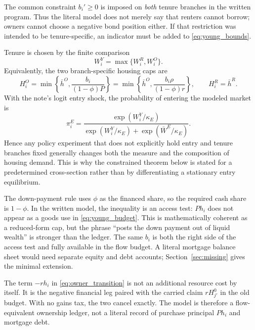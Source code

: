 \documentclass[11pt]{article}
\newcommand{\1}{\mathbf 1}
\begin{document}
The common constraint $b_i'\ge0$ is imposed on \emph{both} tenure branches in
the written program. Thus the literal model does not merely say that renters
cannot borrow; owners cannot choose a negative bond position either. If that
restriction was intended to be tenure-specific, an indicator must be added to
\eqref{eq:young_bounds}.

Tenure is chosen by the finite comparison
\begin{equation}
W_i^Y=\max\{W_i^R,W_i^O\}.
\label{eq:tenure_choice}
\end{equation}
Equivalently, the two branch-specific housing caps are
\begin{equation}
H_i^O=\min\left\{\bar h^O,
\frac{b_i}{(1-\phi)P}\right\}
=\min\left\{\bar h^O,
\frac{b_i\rho}{(1-\phi)r}\right\},
\qquad H_i^R=\bar h^R.
\label{eq:effective_caps}
\end{equation}
With the note's logit entry shock, the probability of entering the modeled
market is
\begin{equation}
\pi_i^E=
\frac{\exp(W_i^Y/\kappa_E)}
{\exp(W_i^Y/\kappa_E)+\exp(\bar W^E/\kappa_E)}.
\label{eq:entry_probability}
\end{equation}
Hence any policy experiment that does not explicitly hold entry and tenure
branches fixed generally changes both the measure and the composition of
housing demand. This is why the constrained theorem below is stated for a
predetermined cross-section rather than by differentiating a stationary
entry equilibrium.

The down-payment rule uses $\phi$ as the financed share, so the required cash
share is $1-\phi$. In the written model, the inequality is an access test:
$P h_i$ does not appear as a goods use in \eqref{eq:young_budget}. This is
mathematically coherent as a reduced-form cap, but the phrase ``posts the down
payment out of liquid wealth'' is stronger than the ledger. The same $b_i$ is
both the right side of the access test and fully available in the flow budget.
A literal mortgage balance sheet would need separate equity and debt accounts;
Section~\ref{sec:missing} gives the minimal extension.

The term $-rh_i$ in \eqref{eq:owner_transition} is not an additional resource
cost by itself. It is the negative financial leg paired with the carried claim
$rH_{j'}^0$ in the old budget. With no gains tax, the two cancel exactly. The
model is therefore a flow-equivalent ownership ledger, not a literal record of
purchase principal $Ph_i$ and mortgage debt.
\end{document}
